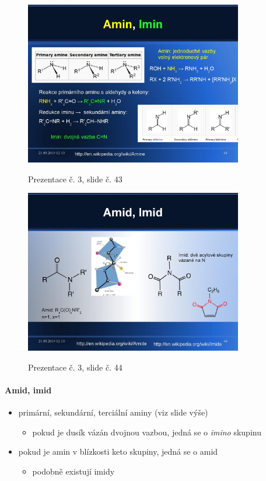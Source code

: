 \documentclass[DIV=8]{scrreprt}
\begin{document}
\begin{figure}
    \caption{Prezentace č. 3, slide č. 43}
    \includegraphics[width=0.85\textwidth]{slides-3/slide-43.jpg}
    \centering
    \label{slides-3-slide-43}
\end{figure}
\begin{figure}
    \caption{Prezentace č. 3, slide č. 44}
    \includegraphics[width=0.85\textwidth]{slides-3/slide-44.jpg}
    \centering
    \label{slides-3-slide-44}
\end{figure}

\paragraph{Amid, imid}
\begin{itemize}[nosep]
    \item primární, sekundární, terciální aminy (viz slide výše)
\begin{itemize}[nosep]
    \item pokud je dusík vázán dvojnou vazbou, jedná se o \emph{imino} skupinu
\end{itemize}

    \item pokud je amin v blízkosti keto skupiny, jedná se o amid
\begin{itemize}[nosep]
    \item podobně existují imidy
\end{itemize}

\end{itemize}
\end{document}
